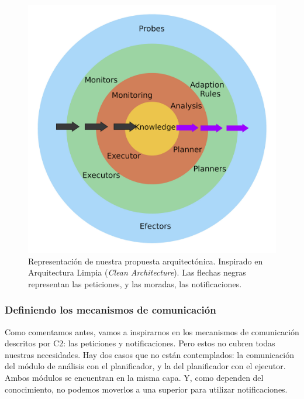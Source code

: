 \begin{figure}[htb]
  \centering
  \includegraphics[scale=0.45]{03_arquitectura/images/clean-arch-2-MAPEK-style-small}
  \caption[Representación de nuestra propuesta arquitectónica. Inspirado en Arquitectura Limpia (\emph{Clean Architecture}). Las flechas negras representan las peticiones, y las moradas, las notificaciones.]{Representación de nuestra propuesta arquitectónica. Inspirado en Arquitectura Limpia (\emph{Clean Architecture}). Las flechas negras representan las peticiones, y las moradas, las notificaciones. \footnotemark }
  \label{fig:clean-mapek-architecture}
\end{figure}


\subsubsection{Definiendo los mecanismos de comunicación}

Como comentamos antes, vamos a inspirarnos en los mecanismos de comunicación descritos por C2: las peticiones y notificaciones. Pero estos no cubren todas nuestras necesidades. Hay dos casos que no están contemplados: la comunicación del módulo de análisis con el planificador, y la del planificador con el ejecutor. Ambos módulos se encuentran en la misma capa. Y, como dependen del conocimiento, no podemos moverlos a una superior para utilizar notificaciones.

